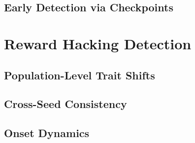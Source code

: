 \documentclass[11pt]{article}
\begin{document}

\subsection{Early Detection via Checkpoints}




\section{Reward Hacking Detection}

\subsection{Population-Level Trait Shifts}



\subsection{Cross-Seed Consistency}


\subsection{Onset Dynamics}
\end{document}
